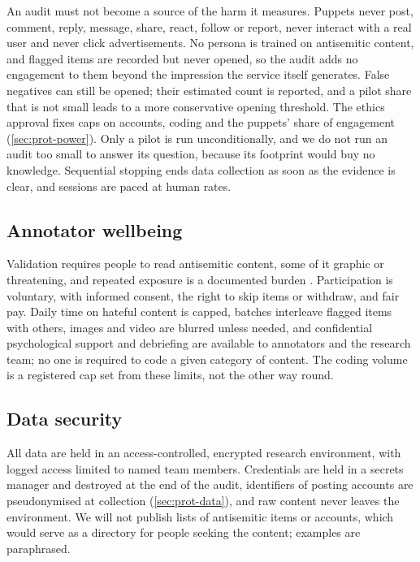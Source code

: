 An audit must not become a source of the harm it measures. Puppets never post, comment, reply, message, share, react, follow or report, never interact with a real user and never click advertisements. No persona is trained on antisemitic content, and flagged items are recorded but never opened, so the audit adds no engagement to them beyond the impression the service itself generates. False negatives can still be opened; their estimated count is reported, and a pilot share that is not small leads to a more conservative opening threshold. The ethics approval fixes caps on accounts, coding and the puppets' share of engagement (\cref{sec:prot-power}). Only a pilot is run unconditionally, and we do not run an audit too small to answer its question, because its footprint would buy no knowledge. Sequential stopping ends data collection as soon as the evidence is clear, and sessions are paced at human rates.

\subsection{Annotator wellbeing}\label{sec:eth-annotators}

Validation requires people to read antisemitic content, some of it graphic or threatening, and repeated exposure is a documented burden \citep{steiger2021}. Participation is voluntary, with informed consent, the right to skip items or withdraw, and fair pay. Daily time on hateful content is capped, batches interleave flagged items with others, images and video are blurred unless needed, and confidential psychological support and debriefing are available to annotators and the research team; no one is required to code a given category of content. The coding volume is a registered cap set from these limits, not the other way round.

\subsection{Data security}\label{sec:eth-security}

All data are held in an access-controlled, encrypted research environment, with logged access limited to named team members. Credentials are held in a secrets manager and destroyed at the end of the audit, identifiers of posting accounts are pseudonymised at collection (\cref{sec:prot-data}), and raw content never leaves the environment. We will not publish lists of antisemitic items or accounts, which would serve as a directory for people seeking the content; examples are paraphrased.

